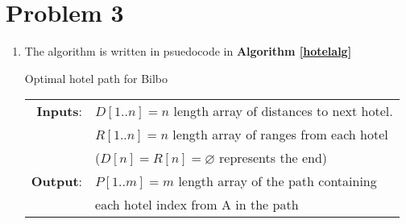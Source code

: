 \documentclass{article}
\begin{document}
\section{Problem 3}
\begin{enumerate}[label=(\alph*)]
    \item The algorithm is written in psuedocode in \textbf{Algorithm \ref{hotelalg}}
    \begin{algorithm}
        \caption{Optimal hotel path for Bilbo}
        \label{hotelalg}

        \begin{tabular}{r l}
            \hspace*{\algorithmicindent} \textbf{Inputs}:    & $D[1..n] = n$ length array of distances to next hotel. \\
                                                            & $R[1..n] = n$ length array of ranges from each hotel \\
                                                            & ($D[n] = R[n] = \varnothing$ represents the end) \\
            \hspace*{\algorithmicindent} \textbf{Output}:   & $P[1..m] = m$ length array of the path containing \\
                                                            & each hotel index from A in the path \\
        \end{tabular}


\end{algorithm}
\end{enumerate}
\end{document}
